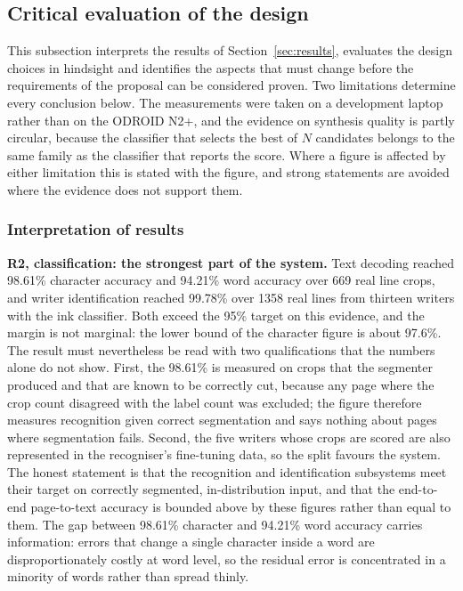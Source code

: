 \label{sec:discussion}

\subsection{Critical evaluation of the design} %
\label{sec:dis-critical}

This subsection interprets the results of Section~\ref{sec:results}, evaluates the design choices in hindsight and identifies the aspects that must change before the requirements of the proposal can be considered proven.
Two limitations determine every conclusion below.
The measurements were taken on a development laptop rather than on the ODROID N2+, and the evidence on synthesis quality is partly circular, because the classifier that selects the best of $N$ candidates belongs to the same family as the classifier that reports the score.
Where a figure is affected by either limitation this is stated with the figure, and strong statements are avoided where the evidence does not support them.

    \subsubsection{Interpretation of results}
    \label{sec:dis-interp}

        \textbf{R2, classification: the strongest part of the system.}
        Text decoding reached 98.61\% character accuracy and 94.21\% word accuracy over 669 real line crops, and writer identification reached 99.78\% over 1358 real lines from thirteen writers with the ink classifier.
        Both exceed the 95\% target on this evidence, and the margin is not marginal: the lower bound of the character figure is about 97.6\%.
        The result must nevertheless be read with two qualifications that the numbers alone do not show.
        First, the 98.61\% is measured on crops that the segmenter produced and that are known to be correctly cut, because any page where the crop count disagreed with the label count was excluded; the figure therefore measures recognition given correct segmentation and says nothing about pages where segmentation fails.
        Second, the five writers whose crops are scored are also represented in the recogniser's fine-tuning data, so the split favours the system.
        The honest statement is that the recognition and identification subsystems meet their target on correctly segmented, in-distribution input, and that the end-to-end page-to-text accuracy is bounded above by these figures rather than equal to them.
        The gap between 98.61\% character and 94.21\% word accuracy carries information: errors that change a single character inside a word are disproportionately costly at word level, so the residual error is concentrated in a minority of words rather than spread thinly.

